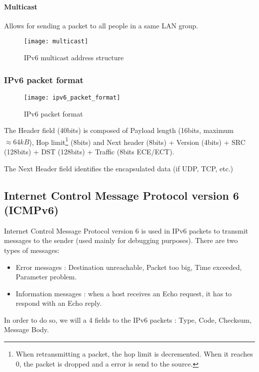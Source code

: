 \paragraph{Multicast}

Allows for sending a packet to all people in a same LAN group.

\begin{figure}[H]
    \centering
    \texttt{[image: multicast]}
    \caption{IPv6 multicast address structure}
\end{figure}

\subsubsection{IPv6 packet format}

\begin{figure}[H]
    \centering
    \texttt{[image: ipv6\_packet\_format]}
    \caption{IPv6 packet format}
\end{figure}

The Header field (40bits) is composed of Payload length (16bits, maximum $\approx 64kB$), Hop limit\footnote{When retransmitting a packet, the hop limit is decremented. When it reaches 0, the packet is dropped and a error is send to the source.} (8bits) and Next header (8bits) + Version (4bits) + SRC (128bits) + DST (128bits) + Traffic (8bits ECE/ECT).

The Next Header field identifies the encapsulated data (if UDP, TCP, etc.)

\subsection[ICMPv6]{Internet Control Message Protocol version 6 (ICMPv6)}

Internet Control Message Protocol version 6 is used in IPv6 packets to transmit messages to the sender (used mainly for debugging purposes). There are two types of messages:
\begin{itemize}
\item Error messages : Destination unreachable, Packet too big, Time exceeded, Parameter problem.
\item Information messages : when a host receives an Echo request, it has to respond with an Echo reply.
\end{itemize}

In order to do so, we will a 4 fields to the IPv6 packets : Type, Code, Checksum, Message Body.

